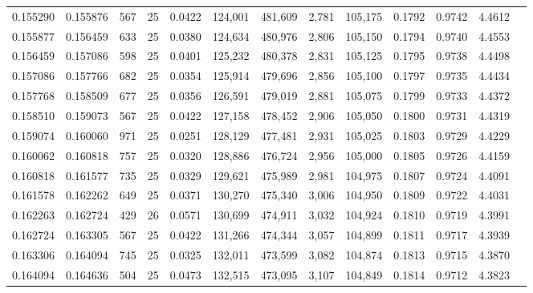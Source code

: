 \begin{tabular}{rrrrrrrrrrrrr}
0.155290 & 0.155876 &   567 &  25 &                                     0.0422 & 124,001 & 481,609 &   2,781 & 105,175 & 0.1792 & 0.9742 & 4.4612 \\
0.155877 & 0.156459 &   633 &  25 &                                     0.0380 & 124,634 & 480,976 &   2,806 & 105,150 & 0.1794 & 0.9740 & 4.4553 \\
0.156459 & 0.157086 &   598 &  25 &                                     0.0401 & 125,232 & 480,378 &   2,831 & 105,125 & 0.1795 & 0.9738 & 4.4498 \\
0.157086 & 0.157766 &   682 &  25 &                                     0.0354 & 125,914 & 479,696 &   2,856 & 105,100 & 0.1797 & 0.9735 & 4.4434 \\
0.157768 & 0.158509 &   677 &  25 &                                     0.0356 & 126,591 & 479,019 &   2,881 & 105,075 & 0.1799 & 0.9733 & 4.4372 \\
0.158510 & 0.159073 &   567 &  25 &                                     0.0422 & 127,158 & 478,452 &   2,906 & 105,050 & 0.1800 & 0.9731 & 4.4319 \\
0.159074 & 0.160060 &   971 &  25 &                                     0.0251 & 128,129 & 477,481 &   2,931 & 105,025 & 0.1803 & 0.9729 & 4.4229 \\
0.160062 & 0.160818 &   757 &  25 &                                     0.0320 & 128,886 & 476,724 &   2,956 & 105,000 & 0.1805 & 0.9726 & 4.4159 \\
0.160818 & 0.161577 &   735 &  25 &                                     0.0329 & 129,621 & 475,989 &   2,981 & 104,975 & 0.1807 & 0.9724 & 4.4091 \\
0.161578 & 0.162262 &   649 &  25 &                                     0.0371 & 130,270 & 475,340 &   3,006 & 104,950 & 0.1809 & 0.9722 & 4.4031 \\
0.162263 & 0.162724 &   429 &  26 &                                     0.0571 & 130,699 & 474,911 &   3,032 & 104,924 & 0.1810 & 0.9719 & 4.3991 \\
0.162724 & 0.163305 &   567 &  25 &                                     0.0422 & 131,266 & 474,344 &   3,057 & 104,899 & 0.1811 & 0.9717 & 4.3939 \\
0.163306 & 0.164094 &   745 &  25 &                                     0.0325 & 132,011 & 473,599 &   3,082 & 104,874 & 0.1813 & 0.9715 & 4.3870 \\
0.164094 & 0.164636 &   504 &  25 &                                     0.0473 & 132,515 & 473,095 &   3,107 & 104,849 & 0.1814 & 0.9712 & 4.3823 \\

\end{tabular}
